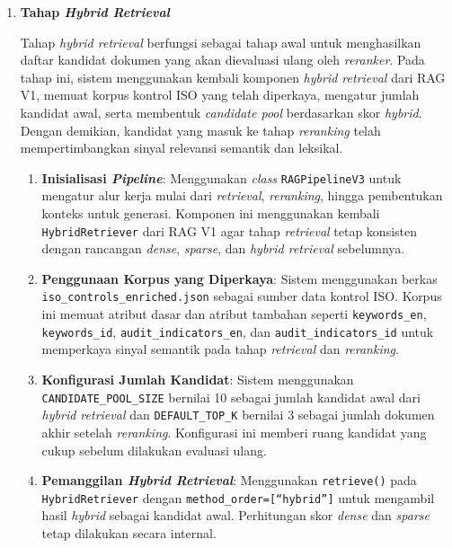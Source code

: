 \documentclass[12pt,a4paper]{article}
\begin{document}
\begin{enumerate}[leftmargin=1.1cm]
\item \textbf{Tahap \textit{Hybrid Retrieval}}

Tahap \textit{hybrid retrieval} berfungsi sebagai tahap awal untuk menghasilkan daftar kandidat dokumen yang akan dievaluasi ulang oleh \textit{reranker}. Pada tahap ini, sistem menggunakan kembali komponen \textit{hybrid retrieval} dari RAG V1, memuat korpus kontrol ISO yang telah diperkaya, mengatur jumlah kandidat awal, serta membentuk \textit{candidate pool} berdasarkan skor \textit{hybrid}. Dengan demikian, kandidat yang masuk ke tahap \textit{reranking} telah mempertimbangkan sinyal relevansi semantik dan leksikal.

\begin{enumerate}[label=\alph*., leftmargin=1.1cm]
\item \textbf{Inisialisasi \textit{Pipeline}}: Menggunakan \textit{class} \texttt{RAGPipelineV3} untuk mengatur alur kerja mulai dari \textit{retrieval}, \textit{reranking}, hingga pembentukan konteks untuk generasi. Komponen ini menggunakan kembali \texttt{HybridRetriever} dari RAG V1 agar tahap \textit{retrieval} tetap konsisten dengan rancangan \textit{dense}, \textit{sparse}, dan \textit{hybrid retrieval} sebelumnya.

\item \textbf{Penggunaan Korpus yang Diperkaya}: Sistem menggunakan berkas \texttt{iso\_controls\_enriched.json} sebagai sumber data kontrol ISO. Korpus ini memuat atribut dasar dan atribut tambahan seperti \texttt{keywords\_en}, \texttt{keywords\_id}, \texttt{audit\_indicators\_en}, dan \texttt{audit\_indicators\_id} untuk memperkaya sinyal semantik pada tahap \textit{retrieval} dan \textit{reranking}.

\item \textbf{Konfigurasi Jumlah Kandidat}: Sistem menggunakan \texttt{CANDIDATE\_POOL\_SIZE} bernilai 10 sebagai jumlah kandidat awal dari \textit{hybrid retrieval} dan \texttt{DEFAULT\_TOP\_K} bernilai 3 sebagai jumlah dokumen akhir setelah \textit{reranking}. Konfigurasi ini memberi ruang kandidat yang cukup sebelum dilakukan evaluasi ulang.

\item \textbf{Pemanggilan \textit{Hybrid Retrieval}}: Menggunakan \texttt{retrieve()} pada \texttt{HybridRetriever} dengan \texttt{method\_order=[``hybrid'']} untuk mengambil hasil \textit{hybrid} sebagai kandidat awal. Perhitungan skor \textit{dense} dan \textit{sparse} tetap dilakukan secara internal.


\end{enumerate}
\end{enumerate}
\end{document}
